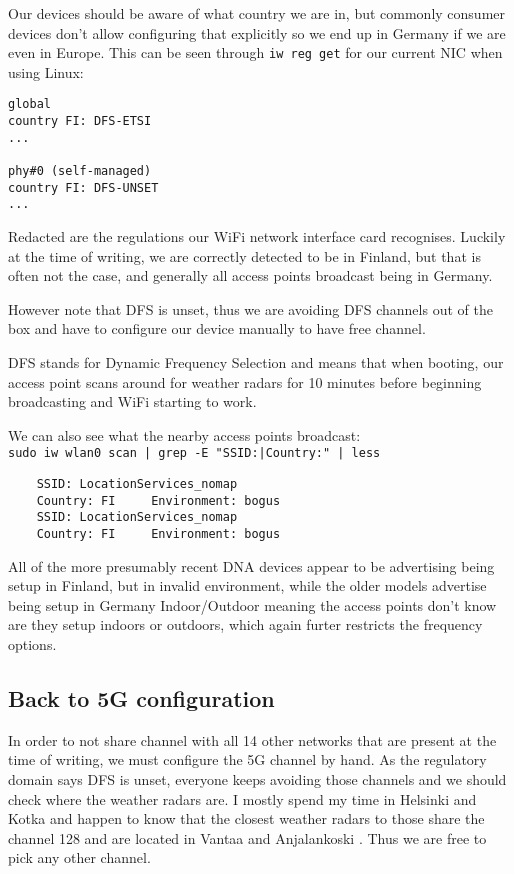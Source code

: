 \documentclass[../wifi-security.tex]{subfiles}
\begin{document}
Our devices should be aware of what country we are in, but commonly consumer devices don't allow configuring that explicitly so we end up in Germany if we are even in Europe. This can be seen through \texttt{iw reg get} for our current NIC when using Linux:

\begin{verbatim}
global
country FI: DFS-ETSI
...

phy#0 (self-managed)
country FI: DFS-UNSET
...
\end{verbatim}

Redacted are the regulations our WiFi network interface card recognises. Luckily at the time of writing, we are correctly detected to be in Finland, but that is often not the case, and generally all access points broadcast being in Germany.

However note that DFS is unset, thus we are avoiding DFS channels out of the box and have to configure our device manually to have free channel.

DFS stands for Dynamic Frequency Selection and means that when booting, our access point scans around for weather radars for 10 minutes before beginning broadcasting and WiFi starting to work.

We can also see what the nearby access points broadcast:\\ \texttt{sudo iw wlan0 scan | grep -E "SSID:|Country:" | less}

\begin{verbatim}
	SSID: LocationServices_nomap
	Country: FI     Environment: bogus
	SSID: LocationServices_nomap
	Country: FI     Environment: bogus
\end{verbatim}

All of the more presumably recent DNA devices appear to be advertising being setup in Finland, but in invalid environment, while the older models advertise being setup in Germany Indoor/Outdoor meaning the access points don't know are they setup indoors or outdoors, which again furter restricts the frequency options.

\subsection{Back to 5G configuration}

In order to not share channel with all 14 other networks that are present at the time of writing, we must configure the 5G channel by hand. As the regulatory domain says DFS is unset, everyone keeps avoiding those channels and we should check where the weather radars are. I mostly spend my time in Helsinki and Kotka and happen to know that the closest weather radars to those share the channel 128 and are located in Vantaa and Anjalankoski \autocite{metisweather}. Thus we are free to pick any other channel.
\end{document}
